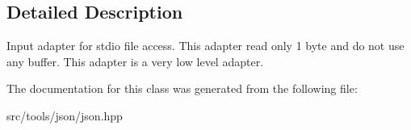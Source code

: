 \subsection{Detailed Description}
Input adapter for stdio file access. This adapter read only 1 byte and do not use any buffer. This adapter is a very low level adapter. 

The documentation for this class was generated from the following file\+:\begin{DoxyCompactItemize}
\item 
src/tools/json/json.\+hpp\end{DoxyCompactItemize}
